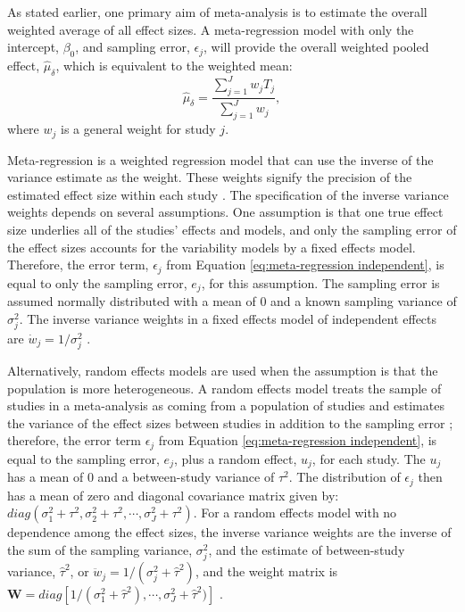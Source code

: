 As stated earlier, one primary aim of meta-analysis is to estimate the overall weighted average of all effect sizes. A meta-regression model with only the intercept, $\beta_0$, and sampling error, $\epsilon_j$,  will provide the overall weighted pooled effect, $\hat{\mu}_{\delta}$,  which is equivalent to the weighted mean:
\begin{equation}
    \label{model_avg_effect}
    \hat{\mu}_{\delta} = \frac{\sum_{j=1}^Jw_j T_j}{\sum_{j=1}^Jw_j},
\end{equation} 
where $w_j$ is a general weight for study $j$.

Meta-regression is a weighted regression model that can use the inverse of the variance estimate as the weight. These weights signify the precision of the estimated effect size within each study \autocite{viechtbauer2007}. The specification of the inverse variance weights depends on several assumptions. One assumption is that one true effect size underlies all of the studies' effects and models, and only the sampling error of the effect sizes accounts for the variability models by a fixed effects model. Therefore, the error term, $\epsilon_j$ from Equation \ref{eq:meta-regression independent}, is equal to only the sampling error, $e_j$, for this assumption. The sampling error is assumed normally distributed with a mean of 0 and a known sampling variance of $\sigma^2_j$. The inverse variance weights in a fixed effects model of independent effects are $\dot{w}_j = 1/\sigma^2_j$ \autocite{cooper2019}. 

Alternatively, random effects models are used when the assumption is that the population is more heterogeneous. A random effects model treats the sample of studies in a meta-analysis as coming from a population of studies and estimates the variance of the effect sizes between studies in addition to the sampling error \autocite{higgins2009}; therefore, the error term $\epsilon_j$ from Equation \ref{eq:meta-regression independent}, is equal to the sampling error, $e_j$, plus a random effect, $u_j$, for each study. The $u_j$ has a mean of 0 and a between-study variance of $\tau^2$. The distribution of $\epsilon_j$ then has a mean of zero and diagonal covariance matrix given by: $diag(\sigma^2_1 + \tau^2, \sigma^2_2 + \tau^2, \cdots, \sigma^2_J + \tau^2)$. For a random effects model with no dependence among the effect sizes, the inverse variance weights are the inverse of the sum of the sampling variance, $\sigma^2_j$, and the estimate of between-study variance, $\hat{\tau}^2$, or $\ddot{w}_j = 1/(\sigma^2_j + \hat{\tau}^2)$, and the weight matrix is $\mathbf{W} = diag[1/(\sigma^2_1 + \hat{\tau}^2), \cdots, \sigma^2_J + \hat{\tau}^2)]$ \autocite{cooper2019}.

